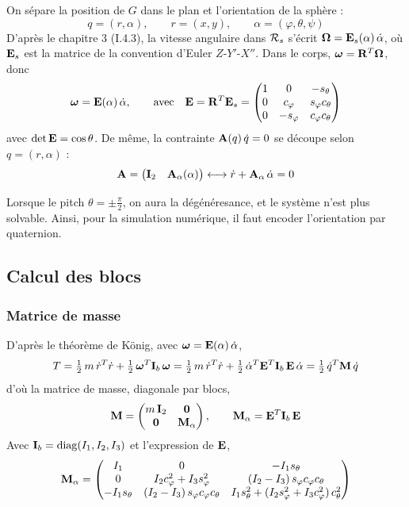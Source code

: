 On sépare la position de $G$ dans le plan et l'orientation de la
sphère :
\[
    q = (r,\alpha),
    \qquad
    r = (x,y),
    \qquad
    \alpha = (\varphi,\theta,\psi)
\]
D'après le chapitre 3 (I.4.3), la vitesse angulaire dans $\mathcal{R}_{s}$
s'écrit $\bm{\Omega} = \mathbf{E}_s(\alpha)\,\dot\alpha$, où
$\mathbf{E}_s$ est la matrice de la convention d'Euler $Z$-$Y'$-$X''$. Dans le
corps, $\bm{\omega} = \mathbf{R}^T\bm{\Omega}$, donc
\[
    \bm{\omega} = \mathbf{E}(\alpha)\,\dot\alpha,
    \qquad 
    \text{avec} \quad
    \mathbf{E} = \mathbf{R}^T\mathbf{E}_s
    = \begin{pmatrix}
        1 & 0 & -s_\theta\\
        0 & c_\varphi & s_\varphi c_\theta\\
        0 & -s_\varphi & c_\varphi c_\theta
    \end{pmatrix}
\]
avec $\det\mathbf{E} = \cos\theta$. De même, la contrainte
$\mathbf{A}(q)\,\dot q = 0$ se découpe selon $q = (r,\alpha)$ :
\[
    \mathbf{A} = \begin{pmatrix} \mathbf{I}_2 & \mathbf{A}_\alpha(\alpha)
    \end{pmatrix}
    \longleftrightarrow
    \dot r + \mathbf{A}_\alpha\,\dot\alpha = 0
\]
\begin{remarque}
    Lorsque le pitch $\theta = \pm \frac{\pi}{2}$, on aura la dégénéresance, et le système n'est plus solvable. Ainsi, pour la simulation numérique, il faut encoder 
    l'orientation par quaternion.
\end{remarque}
\subsection{Calcul des blocs}

\subsubsection{Matrice de masse}

D'après le théorème de König, avec
$\bm{\omega} = \mathbf{E}(\alpha)\,\dot\alpha$,
\[
    T = \tfrac12\,m\,\dot r^T\dot r
    + \tfrac12\,\bm{\omega}^T\mathbf{I}_b\,\bm{\omega}
    = \tfrac12\,m\,\dot r^T\dot r
    + \tfrac12\,\dot\alpha^T\mathbf{E}^T\mathbf{I}_b\,\mathbf{E}\,\dot\alpha
    = \tfrac12\,\dot q^T\mathbf{M}\,\dot q
\]
d'où la matrice de masse, diagonale par blocs,
\[
    \mathbf{M} = \begin{pmatrix}
        m\,\mathbf{I}_2 & \mathbf{0}\\
        \mathbf{0} & \mathbf{M}_\alpha
    \end{pmatrix},
    \qquad
    \mathbf{M}_\alpha = \mathbf{E}^T\mathbf{I}_b\,\mathbf{E}
\]
Avec $\mathbf{I}_b = \mathrm{diag}(I_1,I_2,I_3)$ et l'expression de
$\mathbf{E}$,
\[
    \mathbf{M}_\alpha = \begin{pmatrix}
        I_1 & 0 & -I_1 s_\theta\\
        0 & I_2 c_\varphi^2 + I_3 s_\varphi^2
            & (I_2 - I_3)\,s_\varphi c_\varphi c_\theta\\
        -I_1 s_\theta & (I_2 - I_3)\,s_\varphi c_\varphi c_\theta
            & I_1 s_\theta^2 + (I_2 s_\varphi^2 + I_3 c_\varphi^2)\,
            c_\theta^2
    \end{pmatrix}
\]

